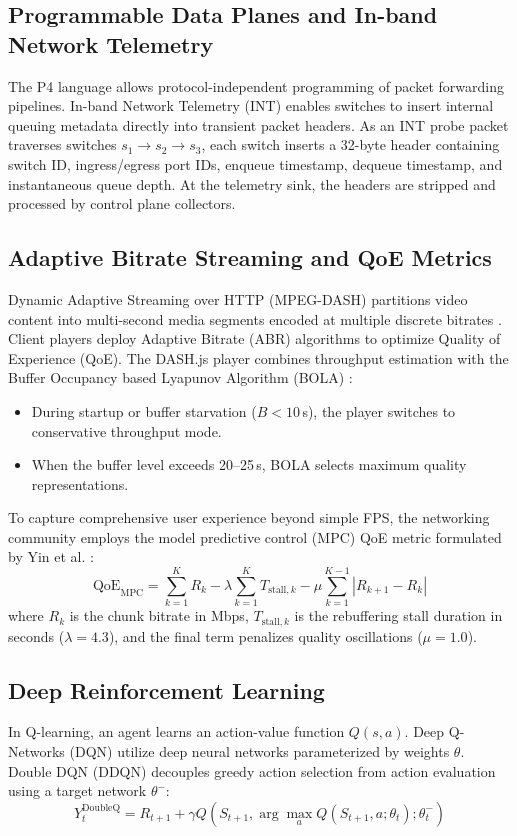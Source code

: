 \documentclass[12pt,a4paper,oneside]{report}
\begin{document}
\subsection{Programmable Data Planes and In-band Network Telemetry}
The P4 language \cite{bosshart2014p4} allows protocol-independent programming of packet forwarding pipelines. In-band Network Telemetry (INT) \cite{kim2015int} enables switches to insert internal queuing metadata directly into transient packet headers. As an INT probe packet traverses switches $s_1 \to s_2 \to s_3$, each switch inserts a 32-byte header containing switch ID, ingress/egress port IDs, enqueue timestamp, dequeue timestamp, and instantaneous queue depth. At the telemetry sink, the headers are stripped and processed by control plane collectors.

\subsection{Adaptive Bitrate Streaming and QoE Metrics}
Dynamic Adaptive Streaming over HTTP (MPEG-DASH) partitions video content into multi-second media segments encoded at multiple discrete bitrates \cite{spiteri2018dash}. Client players deploy Adaptive Bitrate (ABR) algorithms to optimize Quality of Experience (QoE). The DASH.js player combines throughput estimation with the Buffer Occupancy based Lyapunov Algorithm (BOLA) \cite{spiteri2020bola}:
\begin{itemize}
  \item During startup or buffer starvation ($B < 10$\,s), the player switches to conservative throughput mode.
  \item When the buffer level exceeds 20--25\,s, BOLA selects maximum quality representations.
\end{itemize}
To capture comprehensive user experience beyond simple FPS, the networking community employs the model predictive control (MPC) QoE metric formulated by Yin et al. \cite{yin2015mpc}:
\begin{equation}
  \text{QoE}_{\text{MPC}} = \sum_{k=1}^K R_k - \lambda \sum_{k=1}^K T_{\text{stall}, k} - \mu \sum_{k=1}^{K-1} |R_{k+1} - R_k|
  \label{eq:mpc_qoe}
\end{equation}
where $R_k$ is the chunk bitrate in Mbps, $T_{\text{stall}, k}$ is the rebuffering stall duration in seconds ($\lambda = 4.3$), and the final term penalizes quality oscillations ($\mu = 1.0$).

\subsection{Deep Reinforcement Learning}
In Q-learning, an agent learns an action-value function $Q(s, a)$. Deep Q-Networks (DQN) \cite{mnih2015dqn} utilize deep neural networks parameterized by weights $\theta$. Double DQN (DDQN) \cite{vanhasselt2016ddqn} decouples greedy action selection from action evaluation using a target network $\theta^-$:
\begin{equation}
  Y_t^{\text{DoubleQ}} = R_{t+1} + \gamma Q\left(S_{t+1}, \arg\max_a Q(S_{t+1}, a; \theta_t); \theta_t^-\right)
\end{equation}
\end{document}
